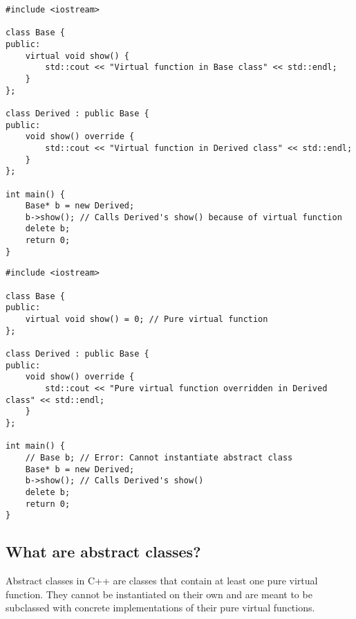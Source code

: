 \begin{tcolorbox}[title=Virtual Function]
\begin{verbatim}
#include <iostream>

class Base {
public:
    virtual void show() {
        std::cout << "Virtual function in Base class" << std::endl;
    }
};

class Derived : public Base {
public:
    void show() override {
        std::cout << "Virtual function in Derived class" << std::endl;
    }
};

int main() {
    Base* b = new Derived;
    b->show(); // Calls Derived's show() because of virtual function
    delete b;
    return 0;
}
\end{verbatim}
\end{tcolorbox}
\begin{tcolorbox}[title=Pure Virtual Function]
\begin{verbatim}
#include <iostream>

class Base {
public:
    virtual void show() = 0; // Pure virtual function
};

class Derived : public Base {
public:
    void show() override {
        std::cout << "Pure virtual function overridden in Derived class" << std::endl;
    }
};

int main() {
    // Base b; // Error: Cannot instantiate abstract class
    Base* b = new Derived;
    b->show(); // Calls Derived's show()
    delete b;
    return 0;
}
\end{verbatim}
\end{tcolorbox}

\subsection{What are abstract classes?}
Abstract classes in C++ are classes that contain at least one pure virtual function. They cannot be instantiated on their own and are meant to be subclassed with concrete implementations of their pure virtual functions.


